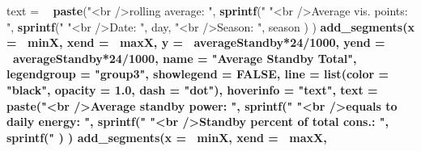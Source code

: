 \documentclass[
]{book}
\newenvironment{Shaded}{\begin{snugshade}}{\end{snugshade}}
\newcommand{\DataTypeTok}[1]{\textcolor[rgb]{0.13,0.29,0.53}{#1}}
\newcommand{\DecValTok}[1]{\textcolor[rgb]{0.00,0.00,0.81}{#1}}
\newcommand{\FloatTok}[1]{\textcolor[rgb]{0.00,0.00,0.81}{#1}}
\newcommand{\KeywordTok}[1]{\textcolor[rgb]{0.13,0.29,0.53}{\textbf{#1}}}
\newcommand{\NormalTok}[1]{#1}
\newcommand{\OperatorTok}[1]{\textcolor[rgb]{0.81,0.36,0.00}{\textbf{#1}}}
\newcommand{\OtherTok}[1]{\textcolor[rgb]{0.56,0.35,0.01}{#1}}
\newcommand{\StringTok}[1]{\textcolor[rgb]{0.31,0.60,0.02}{#1}}
\let\oldShaded\Shaded
\let\endoldShaded\endShaded
\renewenvironment{Shaded}{\footnotesize\oldShaded}{\endoldShaded}
\begin{document}
\begin{Shaded}
\begin{Highlighting}[]
{{{{{{{{{{{{{{{{{{{{{{{{{{{{{{{{{{{{{{{{{{{{               \DataTypeTok{text =} \OperatorTok{~}\StringTok{ }\KeywordTok{paste}\NormalTok{(}\StringTok{"<br />rolling average:        "}\NormalTok{, }\KeywordTok{sprintf}\NormalTok{(}\StringTok{"%
                              \StringTok{"<br />Average vis. points: "}\NormalTok{, }\KeywordTok{sprintf}\NormalTok{(}\StringTok{"%
                              \StringTok{"<br />Date:                        "}\NormalTok{, day,}
                              \StringTok{"<br />Season:                   "}\NormalTok{, season}
\NormalTok{               )}
\NormalTok{  ) }\OperatorTok{%
\StringTok{  }\KeywordTok{add_segments}\NormalTok{(}\DataTypeTok{x =} \OperatorTok{~}\NormalTok{minX,}
               \DataTypeTok{xend =} \OperatorTok{~}\NormalTok{maxX,}
               \DataTypeTok{y =} \OperatorTok{~}\NormalTok{averageStandby}\OperatorTok{*}\DecValTok{24}\OperatorTok{/}\DecValTok{1000}\NormalTok{,}
               \DataTypeTok{yend =} \OperatorTok{~}\NormalTok{averageStandby}\OperatorTok{*}\DecValTok{24}\OperatorTok{/}\DecValTok{1000}\NormalTok{,}
               \DataTypeTok{name =} \StringTok{"Average Standby Total"}\NormalTok{,}
               \DataTypeTok{legendgroup =} \StringTok{"group3"}\NormalTok{,}
               \DataTypeTok{showlegend =} \OtherTok{FALSE}\NormalTok{,}
               \DataTypeTok{line =} \KeywordTok{list}\NormalTok{(}\DataTypeTok{color =} \StringTok{"black"}\NormalTok{, }\DataTypeTok{opacity =} \FloatTok{1.0}\NormalTok{, }\DataTypeTok{dash =} \StringTok{"dot"}\NormalTok{),}
               \DataTypeTok{hoverinfo =} \StringTok{"text"}\NormalTok{,}
               \DataTypeTok{text =} \OperatorTok{~}\StringTok{ }\KeywordTok{paste}\NormalTok{(}\StringTok{"<br />Average standby power:          "}\NormalTok{, }\KeywordTok{sprintf}\NormalTok{(}\StringTok{"%
                              \StringTok{"<br />equals to daily energy:         "}\NormalTok{, }\KeywordTok{sprintf}\NormalTok{(}\StringTok{"%
                              \StringTok{"<br />Standby percent of total cons.: "}\NormalTok{, }\KeywordTok{sprintf}\NormalTok{(}\StringTok{"%
\NormalTok{               )}
\NormalTok{  ) }\OperatorTok{%
\StringTok{  }\KeywordTok{add_segments}\NormalTok{(}\DataTypeTok{x =} \OperatorTok{~}\NormalTok{minX,}
               \DataTypeTok{xend =} \OperatorTok{~}\NormalTok{maxX,}
}}}}}}}}}}}}}}}}}}}}}}}}}}}}}}}}}}}}}}}}}}}}}}}}}}}
\end{Highlighting}
\end{Shaded}
\end{document}
